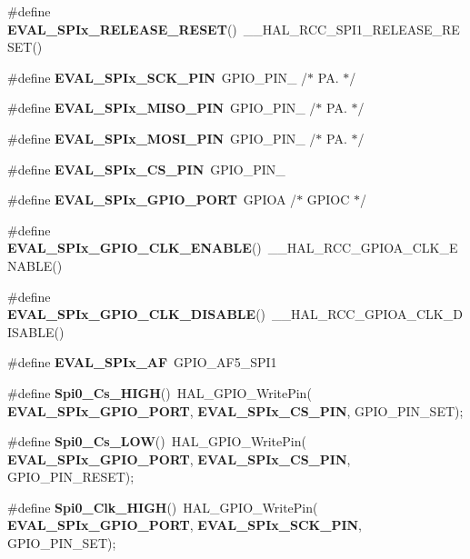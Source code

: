 \begin{DoxyCompactItemize}
\item 
\#define \textbf{ E\+V\+A\+L\+\_\+\+S\+P\+Ix\+\_\+\+R\+E\+L\+E\+A\+S\+E\+\_\+\+R\+E\+S\+ET}()~\+\_\+\+\_\+\+H\+A\+L\+\_\+\+R\+C\+C\+\_\+\+S\+P\+I1\+\_\+\+R\+E\+L\+E\+A\+S\+E\+\_\+\+R\+E\+S\+ET()
\item 
\#define \textbf{ E\+V\+A\+L\+\_\+\+S\+P\+Ix\+\_\+\+S\+C\+K\+\_\+\+P\+IN}~G\+P\+I\+O\+\_\+\+P\+I\+N\+\_                  /$\ast$ P\+A. $\ast$/
\item 
\#define \textbf{ E\+V\+A\+L\+\_\+\+S\+P\+Ix\+\_\+\+M\+I\+S\+O\+\_\+\+P\+IN}~G\+P\+I\+O\+\_\+\+P\+I\+N\+\_                  /$\ast$ P\+A. $\ast$/
\item 
\#define \textbf{ E\+V\+A\+L\+\_\+\+S\+P\+Ix\+\_\+\+M\+O\+S\+I\+\_\+\+P\+IN}~G\+P\+I\+O\+\_\+\+P\+I\+N\+\_                  /$\ast$ P\+A. $\ast$/
\item 
\#define \textbf{ E\+V\+A\+L\+\_\+\+S\+P\+Ix\+\_\+\+C\+S\+\_\+\+P\+IN}~G\+P\+I\+O\+\_\+\+P\+I\+N\+\_
\item 
\#define \textbf{ E\+V\+A\+L\+\_\+\+S\+P\+Ix\+\_\+\+G\+P\+I\+O\+\_\+\+P\+O\+RT}~G\+P\+I\+OA                        /$\ast$ G\+P\+I\+OC $\ast$/
\item 
\#define \textbf{ E\+V\+A\+L\+\_\+\+S\+P\+Ix\+\_\+\+G\+P\+I\+O\+\_\+\+C\+L\+K\+\_\+\+E\+N\+A\+B\+LE}()~\+\_\+\+\_\+\+H\+A\+L\+\_\+\+R\+C\+C\+\_\+\+G\+P\+I\+O\+A\+\_\+\+C\+L\+K\+\_\+\+E\+N\+A\+B\+LE()
\item 
\#define \textbf{ E\+V\+A\+L\+\_\+\+S\+P\+Ix\+\_\+\+G\+P\+I\+O\+\_\+\+C\+L\+K\+\_\+\+D\+I\+S\+A\+B\+LE}()~\+\_\+\+\_\+\+H\+A\+L\+\_\+\+R\+C\+C\+\_\+\+G\+P\+I\+O\+A\+\_\+\+C\+L\+K\+\_\+\+D\+I\+S\+A\+B\+LE()
\item 
\#define \textbf{ E\+V\+A\+L\+\_\+\+S\+P\+Ix\+\_\+\+AF}~G\+P\+I\+O\+\_\+\+A\+F5\+\_\+\+S\+P\+I1
\item 
\#define \textbf{ Spi0\+\_\+\+Cs\+\_\+\+H\+I\+GH}()~H\+A\+L\+\_\+\+G\+P\+I\+O\+\_\+\+Write\+Pin(\textbf{ E\+V\+A\+L\+\_\+\+S\+P\+Ix\+\_\+\+G\+P\+I\+O\+\_\+\+P\+O\+RT},\textbf{ E\+V\+A\+L\+\_\+\+S\+P\+Ix\+\_\+\+C\+S\+\_\+\+P\+IN}, G\+P\+I\+O\+\_\+\+P\+I\+N\+\_\+\+S\+ET);
\item 
\#define \textbf{ Spi0\+\_\+\+Cs\+\_\+\+L\+OW}()~H\+A\+L\+\_\+\+G\+P\+I\+O\+\_\+\+Write\+Pin(\textbf{ E\+V\+A\+L\+\_\+\+S\+P\+Ix\+\_\+\+G\+P\+I\+O\+\_\+\+P\+O\+RT},\textbf{ E\+V\+A\+L\+\_\+\+S\+P\+Ix\+\_\+\+C\+S\+\_\+\+P\+IN}, G\+P\+I\+O\+\_\+\+P\+I\+N\+\_\+\+R\+E\+S\+ET);
\item 
\#define \textbf{ Spi0\+\_\+\+Clk\+\_\+\+H\+I\+GH}()~H\+A\+L\+\_\+\+G\+P\+I\+O\+\_\+\+Write\+Pin(\textbf{ E\+V\+A\+L\+\_\+\+S\+P\+Ix\+\_\+\+G\+P\+I\+O\+\_\+\+P\+O\+RT},\textbf{ E\+V\+A\+L\+\_\+\+S\+P\+Ix\+\_\+\+S\+C\+K\+\_\+\+P\+IN}, G\+P\+I\+O\+\_\+\+P\+I\+N\+\_\+\+S\+ET);

\end{DoxyCompactItemize}
